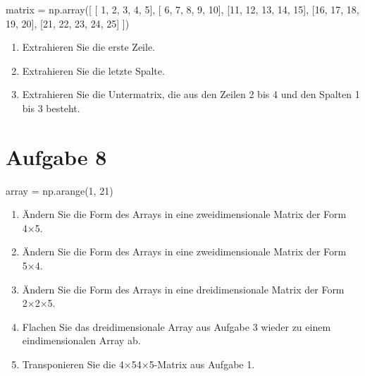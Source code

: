 \documentclass[
  letterpaper,
  DIV=11,
  numbers=noendperiod]{scrreprt}
\newenvironment{Shaded}{\begin{snugshade}}{\end{snugshade}}
\newcommand{\DecValTok}[1]{\textcolor[rgb]{0.68,0.00,0.00}{#1}}
\newcommand{\NormalTok}[1]{\textcolor[rgb]{0.00,0.23,0.31}{#1}}
\newcommand{\OperatorTok}[1]{\textcolor[rgb]{0.37,0.37,0.37}{#1}}
\providecommand{\tightlist}{%
  \setlength{\itemsep}{0pt}\setlength{\parskip}{0pt}}\usepackage{longtable,booktabs,array}
\begin{document}
\begin{tcolorbox}

\begin{Shaded}
\begin{Highlighting}[]
\NormalTok{matrix }\OperatorTok{=}\NormalTok{ np.array([}
\NormalTok{    [ }\DecValTok{1}\NormalTok{,  }\DecValTok{2}\NormalTok{,  }\DecValTok{3}\NormalTok{,  }\DecValTok{4}\NormalTok{,  }\DecValTok{5}\NormalTok{],}
\NormalTok{    [ }\DecValTok{6}\NormalTok{,  }\DecValTok{7}\NormalTok{,  }\DecValTok{8}\NormalTok{,  }\DecValTok{9}\NormalTok{, }\DecValTok{10}\NormalTok{],}
\NormalTok{    [}\DecValTok{11}\NormalTok{, }\DecValTok{12}\NormalTok{, }\DecValTok{13}\NormalTok{, }\DecValTok{14}\NormalTok{, }\DecValTok{15}\NormalTok{],}
\NormalTok{    [}\DecValTok{16}\NormalTok{, }\DecValTok{17}\NormalTok{, }\DecValTok{18}\NormalTok{, }\DecValTok{19}\NormalTok{, }\DecValTok{20}\NormalTok{],}
\NormalTok{    [}\DecValTok{21}\NormalTok{, }\DecValTok{22}\NormalTok{, }\DecValTok{23}\NormalTok{, }\DecValTok{24}\NormalTok{, }\DecValTok{25}\NormalTok{]}
\NormalTok{])}
\end{Highlighting}
\end{Shaded}

\begin{enumerate}
\def\labelenumi{\arabic{enumi}.}
\tightlist
\item
  Extrahieren Sie die erste Zeile.
\item
  Extrahieren Sie die letzte Spalte.
\item
  Extrahieren Sie die Untermatrix, die aus den Zeilen 2 bis 4 und den
  Spalten 1 bis 3 besteht.
\end{enumerate}

\section*{Aufgabe 8}\label{aufgabe-8}


\begin{Shaded}
\begin{Highlighting}[]
\NormalTok{array }\OperatorTok{=}\NormalTok{ np.arange(}\DecValTok{1}\NormalTok{, }\DecValTok{21}\NormalTok{)}
\end{Highlighting}
\end{Shaded}

\begin{enumerate}
\def\labelenumi{\arabic{enumi}.}
\tightlist
\item
  Ändern Sie die Form des Arrays in eine zweidimensionale Matrix der
  Form 4×5.
\item
  Ändern Sie die Form des Arrays in eine zweidimensionale Matrix der
  Form 5×4.
\item
  Ändern Sie die Form des Arrays in eine dreidimensionale Matrix der
  Form 2×2×5.
\item
  Flachen Sie das dreidimensionale Array aus Aufgabe 3 wieder zu einem
  eindimensionalen Array ab.
\item
  Transponieren Sie die 4×54×5-Matrix aus Aufgabe 1.
\end{enumerate}


\end{tcolorbox}
\end{document}
